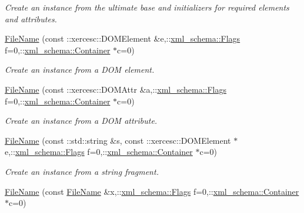 \begin{DoxyCompactItemize}
\begin{DoxyCompactList}\small\item\em Create an instance from the ultimate base and initializers for required elements and attributes. \item\end{DoxyCompactList}\item 
\hyperlink{classopenstack_1_1xml_1_1FileName_a6a0e61194adcc5c4769f58cea62cab6c}{FileName} (const ::xercesc::DOMElement \&e,::\hyperlink{namespacexml__schema_affb4c227cbd9aa7453dd1dc5a1401943}{xml\_\-schema::Flags} f=0,::\hyperlink{namespacexml__schema_a333dea2213742aea47a37532dec4ec27}{xml\_\-schema::Container} $\ast$c=0)
\begin{DoxyCompactList}\small\item\em Create an instance from a DOM element. \item\end{DoxyCompactList}\item 
\hyperlink{classopenstack_1_1xml_1_1FileName_ac5715f43a4cdb635074bf1a5fd35d912}{FileName} (const ::xercesc::DOMAttr \&a,::\hyperlink{namespacexml__schema_affb4c227cbd9aa7453dd1dc5a1401943}{xml\_\-schema::Flags} f=0,::\hyperlink{namespacexml__schema_a333dea2213742aea47a37532dec4ec27}{xml\_\-schema::Container} $\ast$c=0)
\begin{DoxyCompactList}\small\item\em Create an instance from a DOM attribute. \item\end{DoxyCompactList}\item 
\hyperlink{classopenstack_1_1xml_1_1FileName_a118152b9c6b9d3adcc5c578885300f00}{FileName} (const ::std::string \&s, const ::xercesc::DOMElement $\ast$e,::\hyperlink{namespacexml__schema_affb4c227cbd9aa7453dd1dc5a1401943}{xml\_\-schema::Flags} f=0,::\hyperlink{namespacexml__schema_a333dea2213742aea47a37532dec4ec27}{xml\_\-schema::Container} $\ast$c=0)
\begin{DoxyCompactList}\small\item\em Create an instance from a string fragment. \item\end{DoxyCompactList}\item 
\hyperlink{classopenstack_1_1xml_1_1FileName_a0fcd78c2378bd58df2761430bc86885a}{FileName} (const \hyperlink{classopenstack_1_1xml_1_1FileName}{FileName} \&x,::\hyperlink{namespacexml__schema_affb4c227cbd9aa7453dd1dc5a1401943}{xml\_\-schema::Flags} f=0,::\hyperlink{namespacexml__schema_a333dea2213742aea47a37532dec4ec27}{xml\_\-schema::Container} $\ast$c=0)

\end{DoxyCompactItemize}
